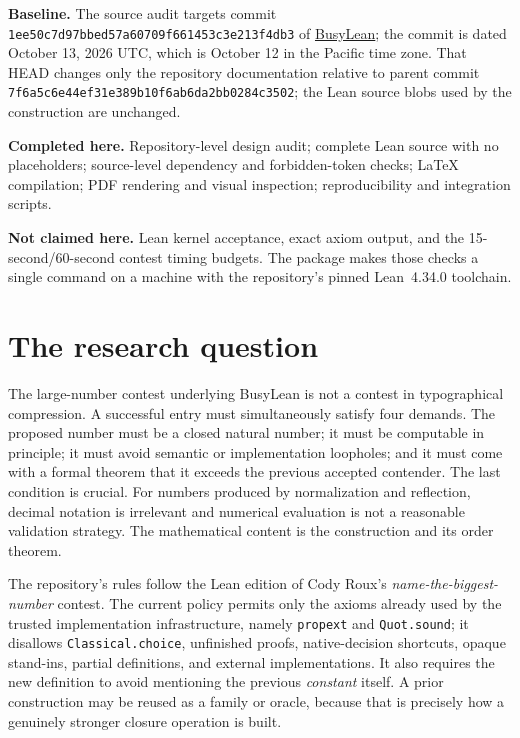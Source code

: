 \documentclass[11pt]{article}
\theoremstyle{definition}
\theoremstyle{remark}
\newcommand{\lean}[1]{\texttt{#1}}
\begin{document}
\begin{tcolorbox}[colback=blue!3,colframe=deepblue,title=Research status]
\textbf{Baseline.} The source audit targets commit
\lean{1ee50c7d97bbed57a60709f661453c3e213f4db3} of
\href{https://github.com/VladimirReshetnikov/BusyLean}{BusyLean}; the commit is
dated October 13, 2026 UTC, which is October 12 in the Pacific time zone.
That HEAD changes only the repository documentation relative to parent commit
\lean{7f6a5c6e44ef31e389b10f6ab6da2bb0284c3502}; the Lean source blobs
used by the construction are unchanged.

\textbf{Completed here.} Repository-level design audit; complete Lean source
with no placeholders; source-level dependency and forbidden-token checks;
LaTeX compilation; PDF rendering and visual inspection; reproducibility and
integration scripts.

\textbf{Not claimed here.} Lean kernel acceptance, exact axiom output, and the
15-second/60-second contest timing budgets.  The package makes those checks a
single command on a machine with the repository's pinned Lean~4.34.0 toolchain.
\end{tcolorbox}

\tableofcontents

\section{The research question}

The large-number contest underlying BusyLean is not a contest in typographical
compression.  A successful entry must simultaneously satisfy four demands.
The proposed number must be a closed natural number; it must be computable in
principle; it must avoid semantic or implementation loopholes; and it must come
with a formal theorem that it exceeds the previous accepted contender.  The
last condition is crucial.  For numbers produced by normalization and
reflection, decimal notation is irrelevant and numerical evaluation is not a
reasonable validation strategy.  The mathematical content is the construction
and its order theorem.

The repository's rules follow the Lean edition of Cody Roux's
\emph{name-the-biggest-number} contest.  The current policy permits only the
axioms already used by the trusted implementation infrastructure, namely
\lean{propext} and \lean{Quot.sound}; it disallows
\lean{Classical.choice}, unfinished proofs, native-decision shortcuts, opaque
stand-ins, partial definitions, and external implementations.  It also
requires the new definition to avoid mentioning the previous \emph{constant}
itself.  A prior construction may be reused as a family or oracle, because that
is precisely how a genuinely stronger closure operation is built.
\end{document}
